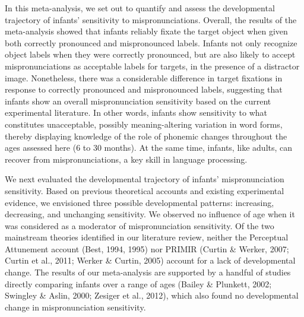 \documentclass[man]{apa6}
\theoremstyle{definition}
\theoremstyle{definition}
\theoremstyle{definition}
\theoremstyle{remark}
\begin{document}
In this meta-analysis, we set out to quantify and assess the
developmental trajectory of infants' sensitivity to mispronunciations.
Overall, the results of the meta-analysis showed that infants reliably
fixate the target object when given both correctly pronounced and
mispronounced labels. Infants not only recognize object labels when they
were correctly pronounced, but are also likely to accept
mispronunciations as acceptable labels for targets, in the presence of a
distractor image. Nonetheless, there was a considerable difference in
target fixations in response to correctly pronounced and mispronounced
labels, suggesting that infants show an overall mispronunciation
sensitivity based on the current experimental literature. In other
words, infants show sensitivity to what constitutes unacceptable,
possibly meaning-altering variation in word forms, thereby displaying
knowledge of the role of phonemic changes throughout the ages assessed
here (6 to 30 months). At the same time, infants, like adults, can
recover from mispronunciations, a key skill in language processing.

We next evaluated the developmental trajectory of infants'
mispronunciation sensitivity. Based on previous theoretical accounts and
existing experimental evidence, we envisioned three possible
developmental patterns: increasing, decreasing, and unchanging
sensitivity. We observed no influence of age when it was considered as a
moderator of mispronunciation sensitivity. Of the two mainstream
theories identified in our literature review, neither the Perceptual
Attunement account (Best, 1994, 1995) nor PRIMIR (Curtin \& Werker,
2007; Curtin et al., 2011; Werker \& Curtin, 2005) account for a lack of
developmental change. The results of our meta-analysis are supported by
a handful of studies directly comparing infants over a range of ages
(Bailey \& Plunkett, 2002; Swingley \& Aslin, 2000; Zesiger et al.,
2012), which also found no developmental change in mispronunciation
sensitivity.
\end{document}

